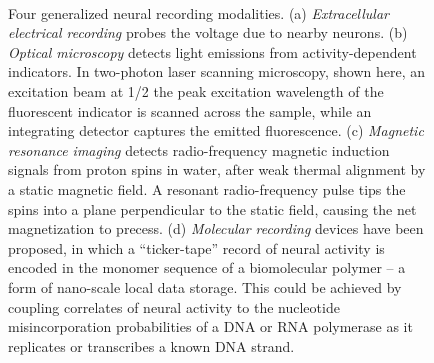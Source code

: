 \begin{figure}[htbp]
\centering
\caption{Four generalized neural recording modalities. (a) \emph{Extracellular electrical recording} probes the voltage due to nearby neurons. (b) \emph{Optical microscopy} detects light emissions from activity-dependent indicators. In two-photon laser scanning microscopy, shown here, an excitation beam at 1/2 the peak excitation wavelength of the fluorescent indicator is scanned across the sample, while an integrating detector captures the emitted fluorescence. (c) \emph{Magnetic resonance imaging} detects radio-frequency magnetic induction signals from proton spins in water, after weak thermal alignment by a static magnetic field. A resonant radio-frequency pulse tips the spins into a plane perpendicular to the static field, causing the net magnetization to precess. (d) \emph{Molecular recording} devices have been proposed, in which a “ticker-tape” record of neural activity is encoded in the monomer sequence of a biomolecular polymer – a form of nano-scale local data storage. This could be achieved by coupling correlates of neural activity to the nucleotide misincorporation probabilities of a DNA or RNA polymerase as it replicates or transcribes a known DNA strand.}  \label{fig:modalities}
\hspace{0.1in}
\\

\end{figure}
